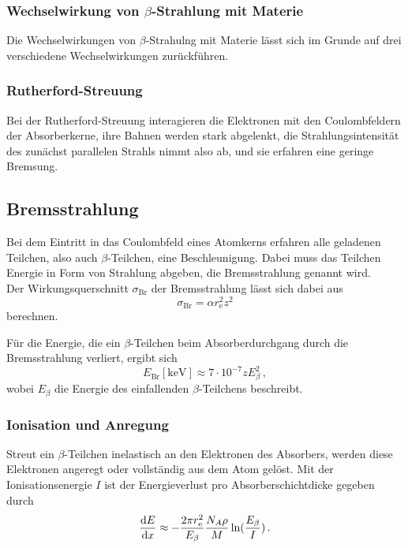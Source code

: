 \subsubsection*{Wechselwirkung von $\beta$-Strahlung mit Materie}

Die Wechselwirkungen von $\beta$-Strahulng mit Materie lässt sich
im Grunde auf drei verschiedene Wechselwirkungen zurückführen.

\subsubsection*{Rutherford-Streuung}

Bei der Rutherford-Streuung interagieren die Elektronen mit 
den Coulombfeldern der Absorberkerne, ihre Bahnen werden stark abgelenkt,
die Strahlungsintensität des zunächst parallelen Strahls nimmt also ab,
und sie erfahren eine geringe Bremsung.

\subsection*{Bremsstrahlung}

Bei dem Eintritt in das Coulombfeld eines Atomkerns erfahren
alle geladenen Teilchen, also auch $\beta$-Teilchen, eine Beschleunigung.
Dabei muss das Teilchen Energie in Form von Strahlung abgeben, die Bremsstrahlung genannt wird. \\

Der Wirkungsquerschnitt $\sigma_{\text{Br}}$ der Bremsstrahlung lässt
sich dabei aus
\begin{equation*}
    \sigma_{\text{Br}} = \alpha r_{\text{e}}^2 z^2
\end{equation*}
berechnen.

Für die Energie, die ein $\beta$-Teilchen beim Absorberdurchgang
durch die Bremsstrahlung verliert, ergibt sich
\begin{equation*}
    E_\text{Br}[\unit{\kilo\eV}] \approx 7 \cdot 10^{-7} z E_\beta^2 \,,
\end{equation*}
wobei $E_\beta$ die Energie des einfallenden $\beta$-Teilchens beschreibt.


\subsubsection*{Ionisation und Anregung}

Streut ein $\beta$-Teilchen inelastisch an den Elektronen des
Absorbers, werden diese Elektronen angeregt oder vollständig aus dem 
Atom gelöst.
Mit der Ionisationsenergie $I$ ist der Energieverlust pro Absorberschichtdicke
gegeben durch
\begin{equation*}
    \frac{\mathrm{d} E}{\mathrm{d} x} \approx - \frac{2 \pi r_\text{e}^2}{E_\beta} \frac{N_A \rho}{M}
    \ln(\frac{E_\beta}{I}) \,.
\end{equation*}


